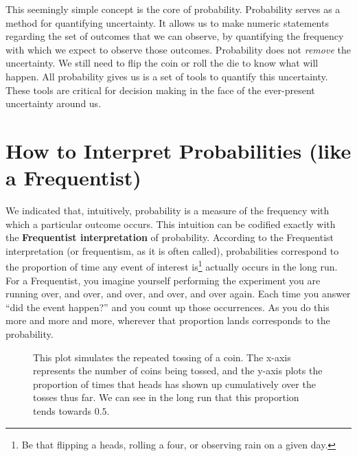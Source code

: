 \documentclass[
  letterpaper,
  DIV=11,
  numbers=noendperiod]{scrreprt}
\theoremstyle{definition}
\theoremstyle{definition}
\theoremstyle{definition}
\theoremstyle{remark}
\begin{document}
This seemingly simple concept is the core of probability. Probability
serves as a method for quantifying uncertainty. It allows us to make
numeric statements regarding the set of outcomes that we can observe, by
quantifying the frequency with which we expect to observe those
outcomes. Probability does not \emph{remove} the uncertainty. We still
need to flip the coin or roll the die to know what will happen. All
probability gives us is a set of tools to quantify this uncertainty.
These tools are critical for decision making in the face of the
ever-present uncertainty around us.

\section{How to Interpret Probabilities (like a
Frequentist)}\label{how-to-interpret-probabilities-like-a-frequentist}

We indicated that, intuitively, probability is a measure of the
frequency with which a particular outcome occurs. This intuition can be
codified exactly with the \textbf{Frequentist interpretation} of
probability. According to the Frequentist interpretation (or
frequentism, as it is often called), probabilities correspond to the
proportion of time any event of interest is\footnote{Be that flipping a
  heads, rolling a four, or observing rain on a given day.} actually
occurs in the long run. For a Frequentist, you imagine yourself
performing the experiment you are running over, and over, and over, and
over, and over again. Each time you answer ``did the event happen?'' and
you count up those occurrences. As you do this more and more and more,
wherever that proportion lands corresponds to the probability.

\begin{figure}[H]

\caption{\label{fig-plot}This plot simulates the repeated tossing of a
coin. The x-axis represents the number of coins being tossed, and the
y-axis plots the proportion of times that heads has shown up
cumulatively over the tosses thus far. We can see in the long run that
this proportion tends towards \(0.5\).}


\end{figure}%
\end{document}
